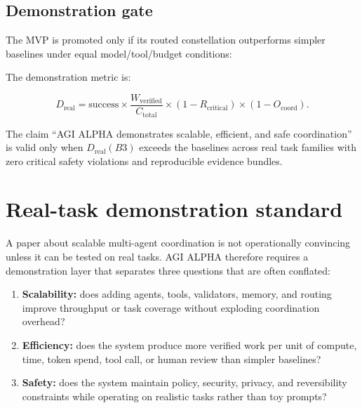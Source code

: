 \subsection{Demonstration gate}\label{demonstration-gate}

The MVP is promoted only if its routed constellation outperforms simpler
baselines under equal model/tool/budget conditions:

\begin{Shaded}
\begin{Highlighting}[]
\end{Highlighting}
\end{Shaded}

The demonstration metric is:

\[
D_{\mathrm{real}}
=
\mathrm{success}\times\frac{W_{\mathrm{verified}}}{C_{\mathrm{total}}}
\times(1-R_{\mathrm{critical}})
\times(1-O_{\mathrm{coord}}).
\]

The claim ``AGI ALPHA demonstrates scalable, efficient, and safe
coordination'' is valid only when \(D_{\mathrm{real}}(B3)\) exceeds the
baselines across real task families with zero critical safety violations
and reproducible evidence bundles.

\section{Real-task demonstration
standard}\label{real-task-demonstration-standard}

A paper about scalable multi-agent coordination is not operationally
convincing unless it can be tested on real tasks. AGI ALPHA therefore
requires a demonstration layer that separates three questions that are
often conflated:

\begin{enumerate}
\def\labelenumi{\arabic{enumi}.}
\tightlist
\item
  \textbf{Scalability:} does adding agents, tools, validators, memory,
  and routing improve throughput or task coverage without exploding
  coordination overhead?
\item
  \textbf{Efficiency:} does the system produce more verified work per
  unit of compute, time, token spend, tool call, or human review than
  simpler baselines?
\item
  \textbf{Safety:} does the system maintain policy, security, privacy,
  and reversibility constraints while operating on realistic tasks
  rather than toy prompts?
\end{enumerate}

